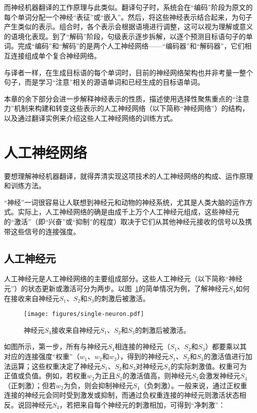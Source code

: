 \documentclass[output=paper,colorlinks,citecolor=brown]{langscibook}
\begin{document}
而神经机器翻译的工作原理与此类似。翻译句子时，系统会在“编码”阶段为原文的每个单词分配一个神经“表征”或“嵌入”。然后，将这些神经表示结合起来，为句子产生类似的表示。组合时，各个表示会根据语境进行调整，这可以视为理解或意义的语境化表现。到了“解码”阶段，句级表示逐步拆解，以逐个预测目标语句子的单词。完成“编码”和“解码”的是两个人工神经网络——“编码器”和“解码器”，它们相互连接组成单个复合神经网络。

与译者一样，在生成目标语的每个单词时，目前的神经网络架构也并非考量一整个句子，而是学习“注意”相关的源语单词和已经生成的目标语单词。

本章的余下部分会进一步解释神经表示的性质，描述使用选择性聚焦重点的“注意力”机制来构建和转变这些表示的人工神经网络（以下简称“神经网络”）的结构，以及通过翻译实例来介绍这些人工神经网络的训练方式。


\section{人工神经网络}

要想理解神经机器翻译，就得弄清实现这项技术的人工神经网络\citep{deeplearningbook}的构成、运作原理和训练方法。

“神经”一词很容易让人联想到神经元和动物的神经系统，尤其是人类大脑的运作方式。实际上，人工神经网络的确是由成千上万个人工神经元组成，这些神经元的“激活”（即“兴奋”或“抑制”的程度）取决于它们从其他神经元接收的信号以及携带这些信号的连接强度。

\subsection{人工神经元}
\begin{sloppypar}
人工神经元是人工神经网络的主要组成部分。这些人工神经元（以下简称“神经元”）的状态更新或激活可分为两步。以图~\ref{fg:neuron}的简单情况为例，了解神经元$S_4$如何在接收来自神经元$S_1$、$S_2$和$S_3$的刺激后被激活。
\end{sloppypar}

\begin{figure}
    \texttt{[image: figures/single-neuron.pdf]}  
    \caption{神经元$S_4$接收来自神经元$S_1$、$S_2$和$S_3$的刺激后被激活。}
    \label{fg:neuron}
\end{figure}

如图所示，第一步，所有与神经元$S_4$相连接的神经元（$S_1$、$S_2$和$S_3$）都要乘以其对应的连接强度“权重”（$w_1$、$w_2$和$w_3$），得到的神经元$S_1$、$S_2$和$S_3$的激活值进行加法运算；这些权重决定了神经元$S_1$、$S_2$和$S_3$对神经元$S_4$的实际刺激值。权重可为正值或负值。例如，若权重$w_2$为正且$S_2$的激活值高，则神经元$S_2$会激发神经元$S_4$（正刺激）；但若$w_2$为负，则会抑制神经元$S_4$（负刺激）。一般来说，通过正权重连接的神经元会同时受到激发或抑制，而通过负权重连接的神经元则激活状态相反。说回神经元$S_4$，若把来自每个神经元的刺激相加，可得到“净刺激”：
\end{document}
